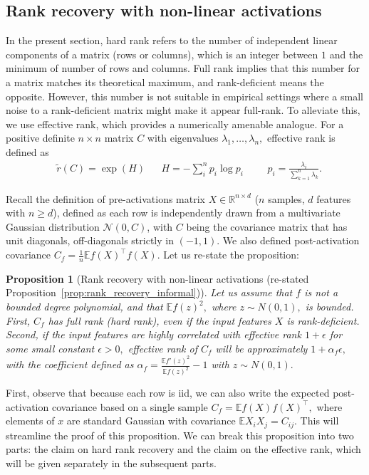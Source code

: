 \documentclass{article}
\newcommand{\R}{\mathbb{R}}
\newcommand{\E}{\mathbb{E}}
\newcommand{\AJ}[1]{\todo[color=green!30,size=\tiny]{AJ: #1}}
\newtheorem{proposition}{Proposition}[section]
\numberwithin{figure}{section}
\begin{document}
\subsection{Rank recovery with non-linear activations}

In the present section, hard rank refers to the number of independent linear components of a matrix (rows or columns), which is an integer between $1$ and the minimum of number of rows and columns. Full rank implies that this number for a matrix matches its theoretical maximum, and rank-deficient means the opposite. However, this number is not suitable in empirical settings where a small noise to a rank-deficient matrix might make it appear full-rank. To alleviate this, we use effective rank, which provides a numerically amenable analogue. For a positive definite $n\times n$ matrix $C$ with eigenvalues $\lambda_1,\dots, \lambda_n,$ effective rank is defined as 
\begin{align*}
&\tilde{r}(C)= \exp(H) &&H =-\sum_i^n p_i\log p_i &&&  p_i = \frac{\lambda_i}{\sum_{k=1}^n \lambda_k}.
\end{align*}

Recall the definition of pre-activations matrix $X \in \R^{n \times d}$ ($n$ samples, $d$ features with $n\ge d$), defined as each row is independently drawn from a multivariate Gaussian distribution $\mathcal{N}(0, C)$, with $C$ being the covariance matrix that has unit diagonals, off-diagonals strictly in $(-1,1)$. We also defined post-activation covariance $C_f = \frac1n \E f(X)^\top f(X).$ Let us re-state the proposition:

\begin{proposition}[Rank recovery with non-linear activations (re-stated Proposition~\ref{prop:rank_recovery_informal})]
Let us assume that  $f$ is not a bounded degree polynomial, and that $\E f(z)^2,$ where $z\sim N(0,1),$ is bounded. First, $C_f$ has full rank (hard rank), even if the input features $X$ is rank-deficient. Second, if the input features are highly correlated with effective rank $1+\epsilon$ for some small constant $\epsilon>0,$ effective rank of $C_f$ will be approximately  $1 + \alpha_f \epsilon,$ with the coefficient defined as $\alpha_f = \frac{\E f'(z)^2}{\E f(z)^2 } - 1$ with $z\sim N(0,1).$
\end{proposition}

First, observe that because each row is iid, we can also write the expected post-activation covariance based on a single sample $C_f = \E f(X) f(X)^\top,$ where elements of $x$ are standard Gaussian with covariance $\E X_i X_j = C_{ij}. $ This will streamline the proof of this proposition.  We can break this proposition into two parts: the claim on hard rank recovery and the claim on the effective rank, which will be given separately in the subsequent parts. 
\end{document}
